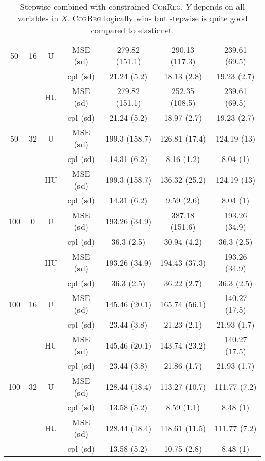 \documentclass[11pt,a4paper]{article}
\begin{document}
\begin{table}[h!]
\begin{tabular}{|c|c|c|c|c|c|c|}
\hline %
50 & 16 & U&	MSE (sd) & 279.82 (151.1) & 290.13 (117.3) & 239.61 (69.5) \\
& & & cpl (sd) & 21.24 (5.2) & 18.13 (2.8) & 19.23 (2.7) \\
 &  &HU &MSE (sd) & 279.82 (151.1) & 252.35 (108.5) & 239.61 (69.5) \\
& & & cpl (sd) & 21.24 (5.2) & 18.97 (2.7) & 19.23 (2.7) \\
\hline %
50 & 32 & U&MSE (sd) & 199.3 (158.7) & 126.81 (17.4) & 124.19 (13) \\
& & & cpl (sd) & 14.31 (6.2) & 8.16 (1.2) & 8.04 (1) \\
 &  &HU &MSE (sd) & 199.3 (158.7) & 136.32 (25.2) & 124.19 (13) \\
& & &cpl (sd) & 14.31 (6.2) & 9.59 (2.6) & 8.04 (1) \\
\hline
\hline %
100 & 0 & U&   MSE (sd) & 193.26 (34.9) & 387.18 (151.6) & 193.26 (34.9) \\
& & & cpl (sd) & 36.3 (2.5) & 30.94 (4.2) & 36.3 (2.5) \\
 &  &HU &   MSE (sd) & 193.26 (34.9) & 194.43 (37.3) & 193.26 (34.9) \\
& & &  cpl (sd) & 36.3 (2.5) & 36.22 (2.7) & 36.3 (2.5) \\
\hline %
100 & 16 & U&  MSE (sd) & 145.46 (20.1) & 165.74 (56.1) & 140.27 (17.5) \\
& & & cpl (sd) & 23.44 (3.8) & 21.23 (2.1) & 21.93 (1.7) \\
 &  &HU &  MSE (sd) & 145.46 (20.1) & 143.74 (23.2) & 140.27 (17.5) \\
& & & cpl (sd) & 23.44 (3.8) & 21.86 (1.7) & 21.93 (1.7) \\
\hline %
100 & 32 & U& MSE (sd) & 128.44 (18.4) & 113.27 (10.7) & 111.77 (7.2) \\
& & &  cpl (sd) & 13.58 (5.2) & 8.59 (1.1) & 8.48 (1) \\
 &  &HU &  MSE (sd) & 128.44 (18.4) & 118.61 (11.5) & 111.77 (7.2) \\
& & & cpl (sd) & 13.58 (5.2) & 10.75 (2.8) & 8.48 (1) \\
\hline
\end{tabular} 
\caption{Stepwise  combined with constrained \textsc{CorReg}. $Y$ depends on all variables in $X$. \textsc{CorReg} logically wins but stepwise is quite good compared to elasticnet.}\label{YXlinstep}
\end{table}
\end{document}
